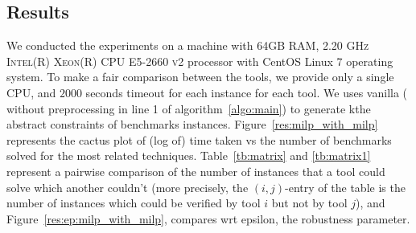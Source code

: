 \begin{table}[t]
\centering
{}
    \caption{Neural networks details}
    \label{tb:nndetail}
\end{table}


\subsection{Results}
We conducted the experiments on a machine with \textsc{64GB RAM, 2.20 GHz Intel(R) Xeon(R) CPU E5-2660 v2}
processor with CentOS Linux 7 operating system. 
To make a fair comparison between the tools, we provide only a single \textsc{CPU}, and $2000$ seconds timeout for each instance for each tool. 
We uses vanilla \deeppoly{}(\deeppoly{} without preprocessing in line 1 of algorithm~\ref{algo:main}) 
to generate kthe abstract constraints of benchmarks instances.
Figure~\ref{res:milp_with_milp} represents the cactus plot of (log of) time taken vs the number of benchmarks 
solved for the most related techniques. Table~\ref{tb:matrix} and \ref{tb:matrix1} represent a 
pairwise comparison of the number of 
instances that a tool could solve which another couldn't  
(more precisely, the $(i,j)$-entry of the table is the number of instances which could be verified 
by tool $i$ but not by tool $j$), and Figure~\ref{res:ep:milp_with_milp}, compares wrt epsilon, the robustness parameter.

